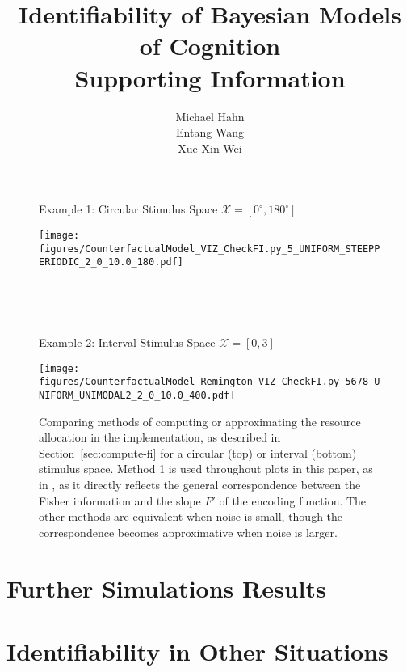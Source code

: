 \documentclass{article}
\title{Identifiability of Bayesian Models of Cognition \\ Supporting Information}
\author{Michael Hahn \\ Entang Wang \\ Xue-Xin Wei}
\begin{document}
\maketitle


\tableofcontents







\begin{figure}
\centering

Example 1: Circular Stimulus Space $\mathcal{X} = [0^\circ, 180^\circ]$

\texttt{[image: figures/CounterfactualModel\_VIZ\_CheckFI.py\_5\_UNIFORM\_STEEPPERIODIC\_2\_0\_10.0\_180.pdf]}

\ \ 

\ \ 

Example 2: Interval Stimulus Space $\mathcal{X} = [0,3]$

\texttt{[image: figures/CounterfactualModel\_Remington\_VIZ\_CheckFI.py\_5678\_UNIFORM\_UNIMODAL2\_2\_0\_10.0\_400.pdf]}
\caption{Comparing methods of computing or approximating the resource allocation in the implementation, as described in Section~\ref{sec:compute-fi} for a circular (top) or interval (bottom) stimulus space. Method 1 is used throughout plots in this paper, as in \cite{hahn2024unifying}, as it directly reflects the general correspondence between the Fisher information and the slope $F'$ of the encoding function. The other methods are equivalent when noise is small, though the correspondence becomes approximative when noise is larger.}\label{fig:four-methods-fi}
\end{figure}






\clearpage


\section{Further Simulations Results}



\clearpage

\section{Identifiability in Other Situations}
\end{document}

